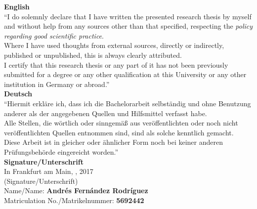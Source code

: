 {\Large \textbf{English}}\\
``I do solemnly declare that I have written the presented research thesis by myself and without help from any sources other than that specified, respecting the {\it policy regarding good scientific practice}\cite{goethepolicy}.\\

Where I have used thoughts from external sources, directly or indirectly, published or unpublished, this is always clearly attributed.\\

I certify that this research thesis or any part of it has not been previously submitted for a degree or any other qualification at this University or any other institution in Germany or abroad.''\\[6mm]


{\Large \textbf{Deutsch}}\\
``Hiermit erkl\"are ich, dass ich die Bachelorarbeit selbst\"andig und ohne Benutzung anderer als der angegebenen Quellen und Hilfsmittel verfasst habe.\\

Alle Stellen, die wörtlich oder sinngemäß aus veröffentlichten oder noch nicht veröffentlichten Quellen entnommen sind, sind als solche kenntlich gemacht.\\

Diese Arbeit ist in gleicher oder ähnlicher Form noch bei keiner anderen Prüfungsbehörde eingereicht worden.''\\[6mm]



{\Large \textbf{Signature/Unterschrift}}\\

In Frankfurt am Main, \underline{\hspace{3.5cm}}, 2017\\[2.3cm]
(Signature/Unterschrift)\\%

Name/Name: \textbf{Andr\'es Fern\'andez Rodr\'iguez}\\
Matriculation No./Matrikelnummer: \textbf{5692442}\\

